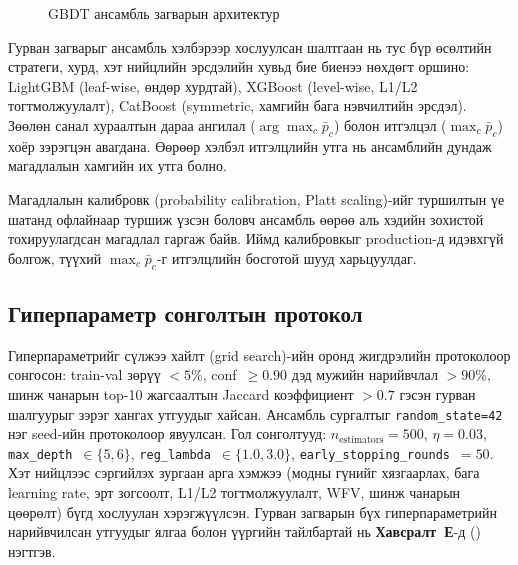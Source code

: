 \begin{figure}[H]
\caption{GBDT ансамбль загварын архитектур}
\label{fig:ensemble_arch}
\end{figure}

Гурван загварыг ансамбль хэлбэрээр хослуулсан шалтгаан нь тус бүр өсөлтийн стратеги, хурд, хэт нийцлийн эрсдэлийн хувьд бие биенээ нөхдөгт оршино: LightGBM (leaf-wise, өндөр хурдтай), XGBoost (level-wise, L1/L2 тогтмолжуулалт), CatBoost (symmetric, хамгийн бага нэвчилтийн эрсдэл). Зөөлөн санал хураалтын дараа ангилал ($\arg\max_c \bar{p}_c$) болон итгэлцэл ($\max_c \bar{p}_c$) хоёр зэрэгцэн авагдана. Өөрөөр хэлбэл итгэлцлийн утга нь ансамблийн дундаж магадлалын хамгийн их утга болно.

Магадлалын калибровк (probability calibration, Platt scaling)-ийг туршилтын үе шатанд офлайнаар туршиж үзсэн боловч ансамбль өөрөө аль хэдийн зохистой тохируулагдсан магадлал гаргаж байв. Иймд калибровкыг production-д идэвхгүй болгож, түүхий $\max_c \bar{p}_c$-г итгэлцлийн босготой шууд харьцуулдаг.

\subsection{Гиперпараметр сонголтын протокол}

Гиперпараметрийг сүлжээ хайлт (grid search)-ийн оронд жигдрэлийн протоколоор сонгосон: train-val зөрүү $<5\%$, conf~$\geq\!0.90$ дэд мужийн нарийвчлал $>90\%$, шинж чанарын top-10 жагсаалтын Jaccard коэффициент $>0.7$ гэсэн гурван шалгуурыг зэрэг хангах утгуудыг хайсан. Ансамбль сургалтыг \texttt{random\_state=42} нэг seed-ийн протоколоор явуулсан. Гол сонголтууд: $n_{\text{estimators}}\!=\!500$, $\eta\!=\!0.03$, \texttt{max\_depth}~$\!\in\!\{5,6\}$, \texttt{reg\_lambda}~$\!\in\!\{1.0, 3.0\}$, \texttt{early\_stopping\_rounds}~$=\!50$. Хэт нийцлээс сэргийлэх зургаан арга хэмжээ (модны гүнийг хязгаарлах, бага learning rate, эрт зогсоолт, L1/L2 тогтмолжуулалт, WFV, шинж чанарын цөөрөлт) бүгд хослуулан хэрэгжүүлсэн. Гурван загварын бүх гиперпараметрийн нарийвчилсан утгуудыг ялгаа болон үүргийн тайлбартай нь \textbf{Хавсралт~Е}-д () нэгтгэв.

